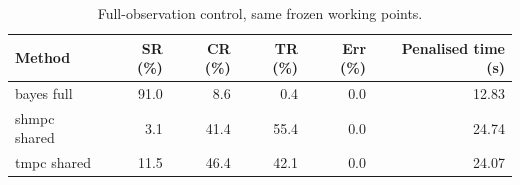 \begin{table}[t]
\centering
\caption{Full-observation control, same frozen working points.}
\label{tab:full_observation}
\small
\begin{tabular}{lrrrrr}
\toprule
Method & SR (\%) & CR (\%) & TR (\%) & Err (\%) & Penalised time (s) \\
\midrule
bayes full & 91.0 & 8.6 & 0.4 & 0.0 & 12.83 \\
shmpc shared & 3.1 & 41.4 & 55.4 & 0.0 & 24.74 \\
tmpc shared & 11.5 & 46.4 & 42.1 & 0.0 & 24.07 \\
\bottomrule
\end{tabular}
\end{table}
